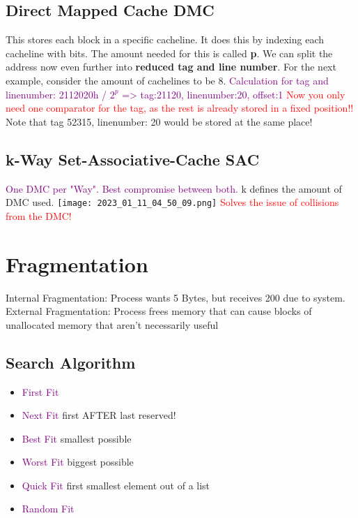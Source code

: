 \documentclass[main.tex,fontsize=8pt,paper=a4,paper=landscape,DIV=calc,]{scrartcl}
\begin{document}
\begin{multicols*}{4}
\subsection{Direct Mapped Cache DMC}
This stores each block in a specific cacheline. 
It does this by indexing each cacheline with bits. The amount needed for this is called \textbf{p}. 
We can split the address now even further into \textbf{reduced tag and line number}.
For the next example, consider the amount of cachelines to be 8.
\textcolor{purple}{Calculation for tag and linenumber: 2112020h / \(2^p\) => tag:21120, linenumber:20, offset:1}
\textcolor{red}{Now you only need one comparator for the tag, as the rest is already stored in a fixed position!!}\newline
\textcolor{OliveGreen}{Note that tag 52315, linenumber: 20 would be stored at the same place!}

\subsection{k-Way Set-Associative-Cache SAC}
\textcolor{purple}{One DMC per "Way". Best compromise between both.}\newline
k defines the amount of DMC used.
\texttt{[image: 2023\_01\_11\_04\_50\_09.png]}
\textcolor{red}{Solves the issue of collisions from the DMC!}

\section{Fragmentation}
\textcolor{OliveGreen}{Internal Fragmentation:} Process wants 5 Bytes, but receives 200 due to system. \newline
\textcolor{OliveGreen}{External Fragmentation:} Process frees memory that can cause blocks of unallocated memory that aren't necessarily useful

\subsection{Search Algorithm}
\begin{itemize}
\item \textcolor{purple}{First Fit}
\item \textcolor{purple}{Next Fit} first AFTER last reserved!
\item \textcolor{purple}{Best Fit} smallest possible
\item \textcolor{purple}{Worst Fit} biggest possible
\item \textcolor{purple}{Quick Fit} \newline
  first smallest element out of a list
\item \textcolor{purple}{Random Fit}
\end{itemize} 


\end{multicols*}
\end{document}
